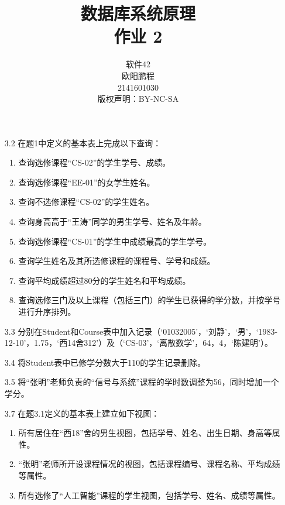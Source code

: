 \documentclass[]{ctexart}
\title{数据库系统原理 \\ 作业 2}
\author{软件42 \\ 欧阳鹏程 \\ 2141601030 \\ 版权声明：BY-NC-SA}
\begin{document}
\maketitle

\begin{enumerate}
	\item[3.2] 在题1中定义的基本表上完成以下查询：
	\begin{enumerate}
		\item 查询选修课程“CS-02”的学生学号、成绩。
		\item 查询选修课程“EE-01”的女学生姓名。
		\item 查询不选修课程“CS-02”的学生姓名。
		\item 查询身高高于“王涛”同学的男生学号、姓名及年龄。
		\item 查询选修课程“CS-01”的学生中成绩最高的学生学号。
		\item 查询学生姓名及其所选修课程的课程号、学号和成绩。
		\item 查询平均成绩超过80分的学生姓名和平均成绩。
		\item 查询选修三门及以上课程（包括三门）的学生已获得的学分数，并按学号进行升序排列。
	\end{enumerate}
	

	\item[3.3] 分别在Student和Course表中加入记录（‘01032005’，‘刘静’，‘男’，‘1983-12-10’，1.75，‘西14舍312’）及（‘CS-03’，‘离散数学’，64，4，‘陈建明’）。
	
	
	\item[3.4]
	将Student表中已修学分数大于110的学生记录删除。
	
	
	\item[3.5]
	将“张明”老师负责的“信号与系统”课程的学时数调整为56，同时增加一个学分。
	
	
	\item[3.7]
	在题3.1定义的基本表上建立如下视图：
	\begin{enumerate}
		\item 所有居住在“西18”舍的男生视图，包括学号、姓名、出生日期、身高等属性。
		\item “张明”老师所开设课程情况的视图，包括课程编号、课程名称、平均成绩等属性。
		\item 所有选修了“人工智能”课程的学生视图，包括学号、姓名、成绩等属性。
	\end{enumerate}
	
\end{enumerate}
\end{document}
